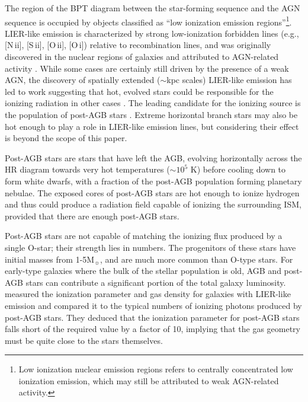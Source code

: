 \documentclass[trackchanges, twocolumn, tighten]{aastex61}
\newcommand{\nii}{[N\,{\sc ii}]\xspace}
\newcommand{\sii}{[S\,{\sc ii}]\xspace}
\newcommand{\oii}{[O\,{\sc ii}]\xspace}
\newcommand{\oi}{[O\,{\sc i}]\xspace}
\newcommand\Msun{\ensuremath{\mathrm{M_{\sun}}}}
\begin{document}
The region of the BPT diagram between the star-forming sequence and the AGN sequence is occupied by objects classified as ``low ionization emission regions''\citep[LIERs, ][]{Belfiore16}\footnote{Low ionization nuclear emission regions \citep[LINERs, ][]{Heckman1980} refers to centrally concentrated low ionization emission, which may still be attributed to weak AGN-related activity.}. LIER-like emission is characterized by strong low-ionization forbidden lines (e.g., \nii{}, \sii{}, \oii{}, \oi{}) relative to recombination lines, and was originally discovered in the nuclear regions of galaxies and attributed to AGN-related activity \citep{Kauffmann03b, Kewley06, Ho08}. While some cases are certainly still driven by the presence of a weak AGN, the discovery of spatially extended (${\sim}$kpc scales) LIER-like emission has led to work suggesting that hot, evolved stars could be responsible for the ionizing radiation in other cases \citep{Singh13, Belfiore16}. The leading candidate for the ionizing source is the population of post-AGB stars \citep{Binette94, Sarzi10, Yan12}. Extreme horizontal branch stars may also be hot enough to play a role in LIER-like emission lines, but considering their effect is beyond the scope of this paper.

Post-AGB stars are stars that have left the AGB, evolving horizontally across the HR diagram towards very hot temperatures ($\sim10^5$ K) before cooling down to form white dwarfs, with a fraction of the post-AGB population forming planetary nebulae. The exposed cores of post-AGB stars are hot enough to ionize hydrogen and thus could produce a radiation field capable of ionizing the surrounding ISM, provided that there are enough post-AGB stars. 

Post-AGB stars are not capable of matching the ionizing flux produced by a single O-star; their strength lies in numbers. The progenitors of these stars have initial masses from 1-5\Msun{}, and are much more common than O-type stars. For early-type galaxies where the bulk of the stellar population is old, AGB and post-AGB stars can contribute a significant portion of the total galaxy luminosity. \citet{Yan12} measured the ionization parameter and gas density for galaxies with LIER-like emission and compared it to the typical numbers of ionizing photons produced by post-AGB stars. They deduced that the ionization parameter for post-AGB stars falls short of the required value by a factor of 10, implying that the gas geometry must be quite close to the stars themselves.
\end{document}

